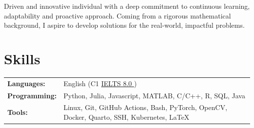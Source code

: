 \documentclass[a4paper,11pt]{article}
\newcommand{\linkicon}{{\footnotesize\faExternalLink*}}
\begin{document}





Driven and innovative individual with a deep commitment to continuous learning, adaptability and proactive approach. Coming from a rigorous mathematical background, I aspire to develop  solutions for the real-world, impactful problems.
\vspace{-2.0em}
\section{Skills}
\noindent
\begin{tabularx}{\linewidth}{@{}l X@{}}
\textbf{Languages:} & English (C1 \href{https://drive.google.com/file/d/1IxH-0NrfMyf-ZqEpQFMrmtcXiDdzc00k/view?usp=sharing}{IELTS 8.0 \linkicon}) \\%

\textbf{Programming:} & Python, Julia, Javascript, MATLAB, C/C++, R, SQL, Java\\

\textbf{Tools:} & Linux, Git, GitHub Actions, Bash, PyTorch, OpenCV, Docker, Quarto, SSH, Kubernetes, \LaTeX \\ %




\end{tabularx}
\end{document}
